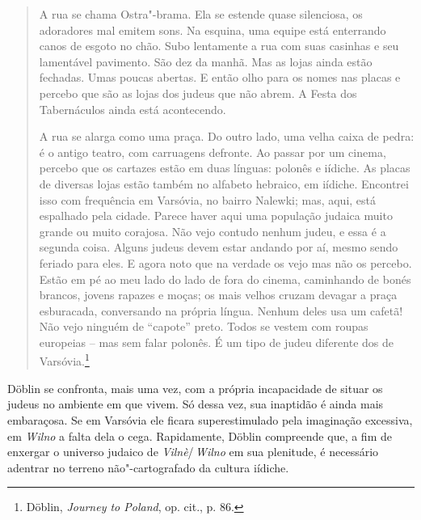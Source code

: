 \begin{quote}
A rua se chama Ostra"-brama. Ela se estende quase silenciosa, os
adoradores mal emitem sons. Na esquina, uma equipe está enterrando canos
de esgoto no chão. Subo lentamente a rua com suas casinhas e seu
lamentável pavimento. São dez da manhã. Mas as lojas ainda estão
fechadas. Umas poucas abertas. E então olho para os nomes nas placas e
percebo que são as lojas dos judeus que não abrem. A Festa dos
Tabernáculos ainda está acontecendo.

A rua se alarga como uma praça. Do outro lado, uma velha caixa de pedra:
é o antigo teatro, com carruagens defronte. Ao passar por um cinema,
percebo que os cartazes estão em duas línguas: polonês e iídiche. As
placas de diversas lojas estão também no alfabeto hebraico, em iídiche.
Encontrei isso com frequência em Varsóvia, no bairro Nalewki; mas, aqui,
está espalhado pela cidade. Parece haver aqui uma população judaica
muito grande ou muito corajosa. Não vejo contudo nenhum judeu, e essa é
a segunda coisa. Alguns judeus devem estar andando por aí, mesmo sendo
feriado para eles. E agora noto que na verdade os vejo mas não os
percebo. Estão em pé ao meu lado do lado de fora do cinema, caminhando
de bonés brancos, jovens rapazes e moças; os mais velhos cruzam devagar
a praça esburacada, conversando na própria língua. Nenhum deles usa um
cafetã! Não vejo ninguém de ``capote'' preto. Todos se vestem com roupas
europeias -- mas sem falar polonês. É um tipo de judeu diferente dos de
Varsóvia.\footnote{Döblin, \textit{Journey to Poland}, op. cit., p. 86.}
\end{quote}

Döblin se confronta, mais uma vez, com a própria incapacidade de situar
os judeus no ambiente em que vivem. Só dessa vez, sua inaptidão é ainda
mais embaraçosa. Se em Varsóvia ele ficara superestimulado pela
imaginação excessiva, em \textit{Wilno} a falta dela o cega. Rapidamente, Döblin
compreende que, a fim de enxergar o universo judaico de \textit{Vilnè}/\,\textit{Wilno} em
sua plenitude, é necessário adentrar no terreno não"-cartografado da
cultura iídiche.

\asterisc

